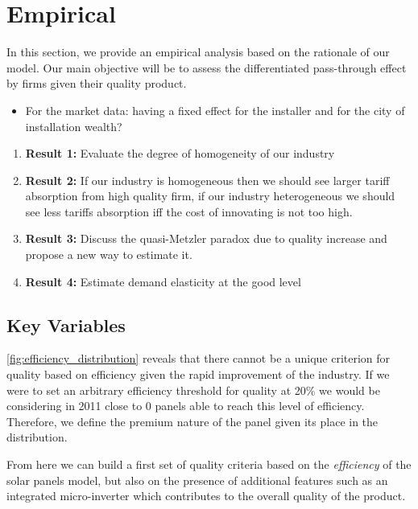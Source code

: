 \section{Empirical} \label{sec:empiricics}

In this section, we provide an empirical analysis based on the rationale of our model. Our main objective will be to assess the differentiated pass-through effect by firms given their quality product. 

\begin{tcolorbox}[title = Questions, colback=white, colframe = yellow]
    \begin{itemize}
        \item For the market data: having a fixed effect for the installer and for the city of installation wealth? 
    \end{itemize}
\end{tcolorbox}

\begin{enumerate}
    \item \textbf{Result 1:} Evaluate the degree of homogeneity of our industry 
    \item \textbf{Result 2:} If our industry is homogeneous then we should see larger tariff absorption from high quality firm, if our industry heterogeneous we should see less tariffs absorption iff the cost of innovating is not too high.
    \item \textbf{Result 3:} Discuss the quasi-Metzler paradox due to quality increase and propose a new way to estimate it.
    \item \textbf{Result 4:} Estimate demand elasticity at the good level
\end{enumerate}

\subsection{Key Variables}

\autoref{fig:efficiency_distribution} reveals that there cannot be a unique criterion for quality based on efficiency given the rapid improvement of the industry. If we were to set an arbitrary efficiency threshold for quality at 20\% we would be considering in 2011 close to 0 panels able to reach this level of efficiency. Therefore, we define the premium nature of the panel given its place in the distribution. 

From here we can build a first set of quality criteria based on the \textit{efficiency} of the solar panels model, but also on the presence of additional features such as an integrated micro-inverter which contributes to the overall quality of the product. 

